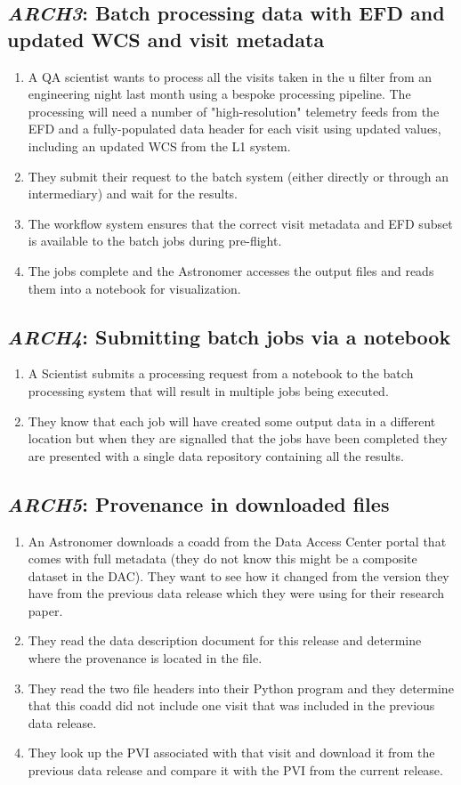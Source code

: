 \documentclass[DM,toc,lsstdraft]{lsstdoc}
\newcommand{\usecase}[3]{%
\subsection{\emph{#1}: #2}
\begin{enumerate}[label=\alph*.]
#3
\end{enumerate}
}
\begin{document}
\usecase{ARCH3}{Batch processing data with EFD and updated WCS and visit metadata}{%

\item
A QA scientist wants to process all the visits taken in the u filter from an engineering night last month using a bespoke processing pipeline.
The processing will need a number of "high-resolution" telemetry feeds from the EFD and a fully-populated data header for each visit using updated values, including an updated WCS from the L1 system.

\item
They submit their request to the batch system (either directly or through an intermediary) and wait for the results.

\item
The workflow system ensures that the correct visit metadata and EFD subset is available to the batch jobs during pre-flight.

\item
The jobs complete and the Astronomer accesses the output files and reads them into a notebook for visualization.

}

\usecase{ARCH4}{Submitting batch jobs via a notebook}{%

\item
A Scientist submits a processing request from a notebook to the batch processing system that will result in multiple jobs being executed.

\item
They know that each job will have created some output data in a different location but when they are signalled that the jobs have been completed they are presented with a single data repository containing all the results.

}

\usecase{ARCH5}{Provenance in downloaded files}{%

\item
An Astronomer downloads a coadd from the Data Access Center portal that comes with full metadata (they do not know this might be a composite dataset in the DAC).
They want to see how it changed from the version they have from the previous data release which they were using for their research paper.

\item
They read the data description document for this release and determine where the provenance is located in the file.

\item
They read the two file headers into their Python program and they determine that this coadd did not include one visit that was included in the previous data release.

\item
They look up the PVI associated with that visit and download it from the previous data release and compare it with the PVI from the current release.

}
\end{document}
